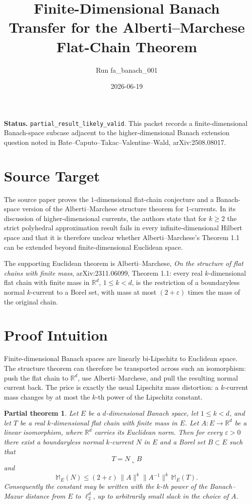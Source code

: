 \documentclass[11pt]{amsart}
\newtheorem*{theorem*}{Partial theorem}
\newcommand{\Mass}{\mathbb M}
\newcommand{\R}{\mathbb R}
\begin{document}
\title[Finite-Dimensional Banach Transfer]{Finite-Dimensional Banach Transfer for the Alberti--Marchese Flat-Chain Theorem}
\author{Run fa\_banach\_001}
\date{2026-06-19}
\maketitle

\noindent
\textbf{Status.} \texttt{partial\_result\_likely\_valid}. This packet records a
finite-dimensional Banach-space subcase adjacent to the higher-dimensional
Banach extension question noted in Bate--Caputo--Takac--Valentine--Wald,
arXiv:2508.08017.

\section*{Source Target}

The source paper proves the \(1\)-dimensional flat-chain conjecture and a
Banach-space version of the Alberti--Marchese structure theorem for
\(1\)-currents. In its discussion of higher-dimensional currents, the authors
state that for \(k\ge 2\) the strict polyhedral approximation result fails in
every infinite-dimensional Hilbert space and that it is therefore unclear
whether Alberti--Marchese's Theorem 1.1 can be extended beyond
finite-dimensional Euclidean space.

The supporting Euclidean theorem is Alberti--Marchese, \emph{On the structure
of flat chains with finite mass}, arXiv:2311.06099, Theorem 1.1: every
real \(k\)-dimensional flat chain with finite mass in \(\R^d\), \(1\le k<d\),
is the restriction of a boundaryless normal \(k\)-current to a Borel set, with
mass at most \((2+\varepsilon)\) times the mass of the original chain.

\section*{Proof Intuition}

Finite-dimensional Banach spaces are linearly bi-Lipschitz to Euclidean space.
The structure theorem can therefore be transported across such an isomorphism:
push the flat chain to \(\R^d\), use Alberti--Marchese, and pull the resulting
normal current back. The price is exactly the usual Lipschitz mass distortion:
a \(k\)-current mass changes by at most the \(k\)-th power of the Lipschitz
constant.

\begin{theorem*}
Let \(E\) be a \(d\)-dimensional Banach space, let \(1\le k<d\), and let
\(T\) be a real \(k\)-dimensional flat chain with finite mass in \(E\).
Let \(A:E\to \R^d\) be a linear isomorphism, where \(\R^d\) carries its
Euclidean norm. Then for every \(\varepsilon>0\) there exist a boundaryless
normal \(k\)-current \(N\) in \(E\) and a Borel set \(B\subset E\) such that
\[
  T=N\llcorner B
\]
and
\[
  \Mass_E(N)
  \le (2+\varepsilon)\,\|A\|^k\|A^{-1}\|^k\,\Mass_E(T).
\]
Consequently the constant may be written with the \(k\)-th power of the
Banach--Mazur distance from \(E\) to \(\ell_2^d\), up to arbitrarily small
slack in the choice of \(A\).
\end{theorem*}
\end{document}
